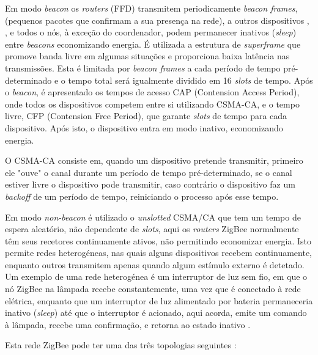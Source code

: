 \documentclass[conference]{IEEEtran}
\begin{document}
Em modo \textit{beacon} os \textit{routers} (FFD) transmitem periodicamente \textit{beacon frames}, (pequenos pacotes que confirmam a sua presença na rede), a outros dispositivos \cite{cirilo2014computaccao}, \cite{liang2006impact}, e todos o nós, à exceção do coordenador, podem permanecer inativos (\textit{sleep}) entre \textit{beacons} economizando energia.
É utilizada a estrutura de \textit{superframe} que promove banda livre em algumas situações e proporciona baixa latência nas transmissões.
Esta é limitada por \textit{beacon frames} a cada período de tempo pré-determinado e o tempo total será igualmente dividido em 16 \textit{slots} de tempo.
Após o \textit{beacon}, é apresentado os tempos de acesso CAP (Contension Access Period), onde todos os dispositivos competem entre si utilizando CSMA-CA, e o tempo livre, CFP (Contension Free Period), que garante \textit{slots} de tempo para cada dispositivo. 
Após isto, o dispositivo entra em modo inativo, economizando energia.

O CSMA-CA consiste em, quando um dispositivo pretende transmitir, primeiro ele "ouve" o canal durante um período de tempo pré-determinado, se o canal estiver livre o dispositivo pode transmitir, caso contrário o dispositivo faz um \textit{backoff} de um período de tempo, reiniciando o processo após esse tempo.

Em modo \textit{non-beacon} é utilizado o \textit{unslotted} CSMA/CA que tem um tempo de espera aleatório, não dependente de \textit{slots}, aqui os \textit{routers} ZigBee normalmente têm seus recetores continuamente ativos, não permitindo economizar energia.
Isto permite redes heterogéneas, nas quais alguns dispositivos recebem continuamente, enquanto outros transmitem apenas quando algum estímulo externo é detetado. 
Um exemplo de uma rede heterogénea é um interruptor de luz sem fio, em que o nó ZigBee na lâmpada recebe constantemente, uma vez que é conectado à rede elétrica, enquanto que um interruptor de luz alimentado por bateria permaneceria inativo (\textit{sleep}) até que o interruptor é acionado, aqui acorda, emite um comando à lâmpada, recebe uma confirmação, e retorna ao estado inativo \cite{zigbee_online}.

Esta rede ZigBee pode ter uma das três topologias seguintes \cite{sinem2004zigbee}: %
\end{document}
